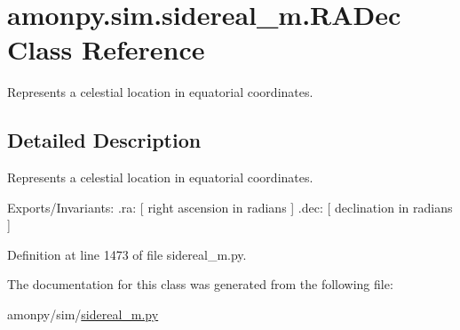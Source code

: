 \hypertarget{classamonpy_1_1sim_1_1sidereal__m_1_1_r_a_dec}{\section{amonpy.\-sim.\-sidereal\-\_\-m.\-R\-A\-Dec Class Reference}
\label{classamonpy_1_1sim_1_1sidereal__m_1_1_r_a_dec}
}


Represents a celestial location in equatorial coordinates.  




\subsection{Detailed Description}
Represents a celestial location in equatorial coordinates. 

Exports/\-Invariants\-: .ra\-: \mbox{[} right ascension in radians \mbox{]} .dec\-: \mbox{[} declination in radians \mbox{]} 

Definition at line 1473 of file sidereal\-\_\-m.\-py.



The documentation for this class was generated from the following file\-:\begin{DoxyCompactItemize}
\item 
amonpy/sim/\hyperlink{sidereal__m_8py}{sidereal\-\_\-m.\-py}\end{DoxyCompactItemize}
